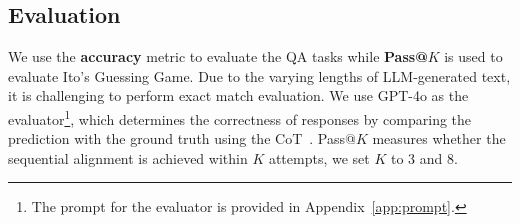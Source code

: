 \subsection{Evaluation}
We use the \textbf{accuracy} metric to evaluate the QA tasks while \textbf{Pass@$K$} is used to evaluate Ito's Guessing Game.
Due to the varying lengths of LLM-generated
text, it is challenging to perform exact match evaluation.
We use GPT-4o as the evaluator\footnote{The prompt for the evaluator is provided in Appendix~\ref{app:prompt}.}, which determines the correctness of responses by comparing the prediction with the ground truth using the CoT~\cite{wei2022chain}.
Pass@$K$ measures whether the sequential alignment is achieved within $K$ attempts, we set $K$ to 3 and 8.

